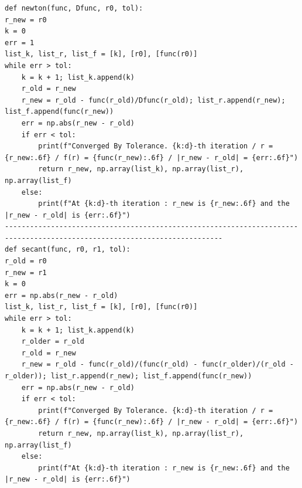 \documentclass{article} %
\begin{document}
\begin{verbatim}
def newton(func, Dfunc, r0, tol):
r_new = r0
k = 0
err = 1
list_k, list_r, list_f = [k], [r0], [func(r0)]
while err > tol:
    k = k + 1; list_k.append(k)
    r_old = r_new
    r_new = r_old - func(r_old)/Dfunc(r_old); list_r.append(r_new); list_f.append(func(r_new))
    err = np.abs(r_new - r_old)
    if err < tol:
        print(f"Converged By Tolerance. {k:d}-th iteration / r = {r_new:.6f} / f(r) = {func(r_new):.6f} / |r_new - r_old| = {err:.6f}")
        return r_new, np.array(list_k), np.array(list_r), np.array(list_f)
    else:
        print(f"At {k:d}-th iteration : r_new is {r_new:.6f} and the |r_new - r_old| is {err:.6f}")
--------------------------------------------------------------------------------------------------------------------------
def secant(func, r0, r1, tol):
r_old = r0
r_new = r1
k = 0
err = np.abs(r_new - r_old)
list_k, list_r, list_f = [k], [r0], [func(r0)]
while err > tol:
    k = k + 1; list_k.append(k)
    r_older = r_old
    r_old = r_new
    r_new = r_old - func(r_old)/(func(r_old) - func(r_older)/(r_old - r_older)); list_r.append(r_new); list_f.append(func(r_new))
    err = np.abs(r_new - r_old)
    if err < tol:
        print(f"Converged By Tolerance. {k:d}-th iteration / r = {r_new:.6f} / f(r) = {func(r_new):.6f} / |r_new - r_old| = {err:.6f}")
        return r_new, np.array(list_k), np.array(list_r), np.array(list_f)
    else:
        print(f"At {k:d}-th iteration : r_new is {r_new:.6f} and the |r_new - r_old| is {err:.6f}")
\end{verbatim}
\end{document}
